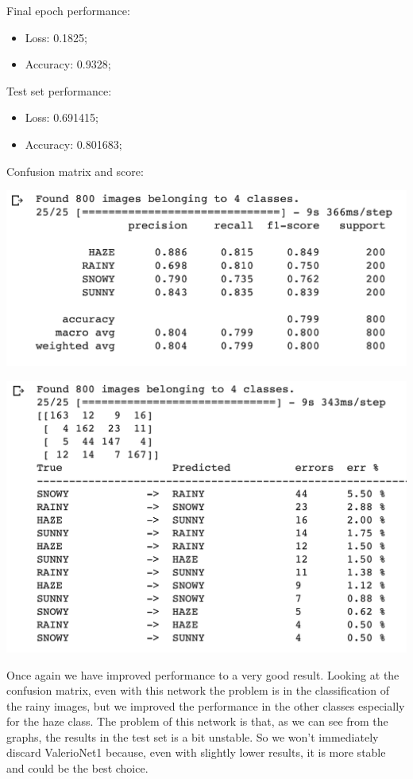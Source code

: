 \documentclass[12pt]{article}
\begin{document}
\newpage
Final epoch performance:
\begin{itemize}
 \item Loss: 0.1825;
 \item Accuracy: 0.9328;
\end{itemize}

Test set performance:
\begin{itemize}
 \item Loss: 0.691415;
 \item Accuracy: 0.801683;
\end{itemize}

Confusion matrix and score: \newline
\begin{minipage}[c]{.5\textwidth}
 \centering
 \includegraphics[width=\textwidth]{pic4}
\end{minipage}
\hspace{1em}
\begin{minipage}[c]{.5\textwidth}
 \centering
 \includegraphics[width=\textwidth]{pic5}
\end{minipage}

Once again we have improved performance to a very good result. Looking at the confusion matrix, even with this network the problem is in the classification of the rainy images, but we improved the performance in the other classes especially for the haze class. The problem of this network is that, as we can see from the graphs, the results in the test set is a bit unstable. So we won't immediately discard ValerioNet1 because, even with slightly lower results, it is more stable and could be the best choice.
\end{document}
